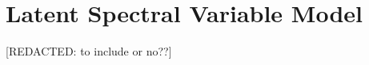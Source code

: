 \section{Latent Spectral Variable Model}
\label{sec:chap10-lsvm}

[REDACTED: to include or no??]

%
%
%
%
%
%
%
%
